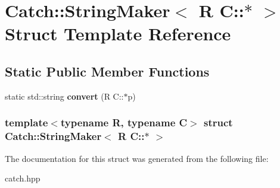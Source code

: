 \hypertarget{structCatch_1_1StringMaker_3_01R_01C_1_1_5_01_4}{
\section{Catch::StringMaker$<$ R C::$\ast$ $>$ Struct Template Reference}
\label{structCatch_1_1StringMaker_3_01R_01C_1_1_5_01_4}
}
\subsection*{Static Public Member Functions}
\begin{DoxyCompactItemize}
\item 
\hypertarget{structCatch_1_1StringMaker_3_01R_01C_1_1_5_01_4_af69c15e0b406e945777137fe4a333731}{
static std::string {\bfseries convert} (R C::$\ast$p)}
\label{structCatch_1_1StringMaker_3_01R_01C_1_1_5_01_4_af69c15e0b406e945777137fe4a333731}

\end{DoxyCompactItemize}
\subsubsection*{template$<$typename R, typename C$>$ struct Catch::StringMaker$<$ R C::$\ast$ $>$}



The documentation for this struct was generated from the following file:\begin{DoxyCompactItemize}
\item 
catch.hpp\end{DoxyCompactItemize}
